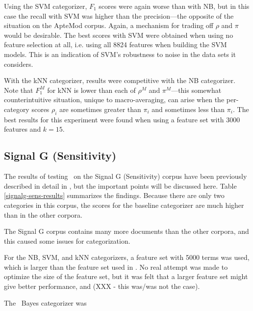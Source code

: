 Using the SVM categorizer, $F_1$ scores were again worse than with NB,
but in this case the recall with SVM was higher than the
precision---the opposite of the situation on the ApteMod corpus.
Again, a mechanism for trading off $\rho$ and $\pi$ would be
desirable.  The best scores with SVM were obtained when using no
feature selection at all, i.e. using all 8824 features when building
the SVM models.  This is an indication of SVM's robustness to noise in
the data sets it considers.

With the kNN categorizer, results were competitive with the NB
categorizer.  Note that $F_1^M$ for kNN is lower than each of $\rho^M$
and $\pi^M$---this somewhat counterintuitive situation, unique to
macro-averaging, can arise when the per-category scores $\rho_i$ are
sometimes greater than $\pi_i$ and sometimes less than $\pi_i$.  The
best results for this experiment were found when using a feature set
with 3000 features and $k=15$.


\subsection{Signal G (Sensitivity)}

The results of testing \aicat\ on the Signal G (Sensitivity) corpus
have been previously described in detail in \cite{calvo:02}, but the
important points will be discussed here.  Table
\ref{signalg-sens-results} summarizes the findings.  Because there are
only two categories in this corpus, the scores for the baseline
categorizer are much higher than in the other corpora.

The Signal G corpus contains many more documents than the other
corpora, and this caused some issues for categorization.

For the NB, SVM, and kNN categorizers, a feature set with 5000 terms
was used, which is larger than the feature set used in
\cite{calvo:02}.  No real attempt was made to optimize the size of the
feature set, but it was felt that a larger feature set might give
better performance, and (XXX - this was/was not the case).

The \naive\ Bayes categorizer was


